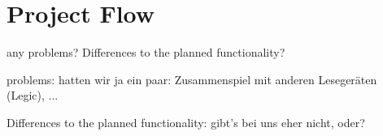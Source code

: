 \section{Project Flow}\label{sec:project_flow}

any problems? Differences to the planned functionality?

problems:
hatten wir ja ein paar: Zusammenspiel mit anderen Lesegeräten (Legic), ...


Differences to the planned functionality:
gibt's bei uns eher nicht, oder?